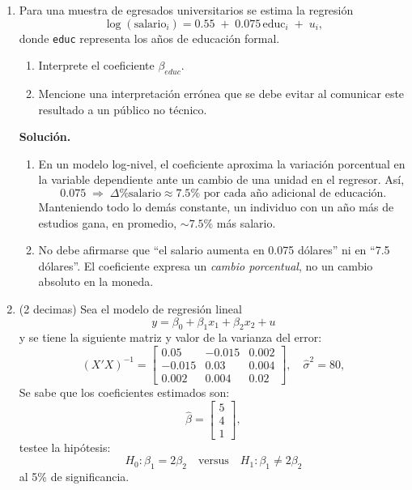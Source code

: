 \documentclass[10pt,a4paper]{article}
\begin{document}
\begin{enumerate}
 \item Para una muestra de egresados universitarios se estima la regresión
        \[
          \log(\text{salario}_i)
          = 0.55 \;+\; 0.075\,\text{educ}_i \;+\; u_i ,
        \]
        donde \texttt{educ} representa los años de educación formal.

        \begin{enumerate}[label=\alph*)]
          \item Interprete el coeficiente $\beta_{educ}$.
          \item Mencione una interpretación errónea que se debe evitar al
                comunicar este resultado a un público no técnico.
        \end{enumerate}

        \textbf{Solución.}
        \begin{enumerate}[label=\alph*)]
          \item En un modelo log‐nivel, el coeficiente aproxima la variación
                porcentual en la variable dependiente ante un cambio de una
                unidad en el regresor.  Así,
                \[
                  0.075
                  \;\Longrightarrow\;
                  \Delta\%\text{salario} \approx 7.5\%
                  \text{ por cada año adicional de educación.}
                \]
                Manteniendo todo lo demás constante, un individuo con un año
                más de estudios gana, en promedio, \(\sim7.5\%\) más salario.
          \item No debe afirmarse que “el salario aumenta en
                0.075 dólares” ni en “7.5 dólares”.  El coeficiente expresa un
                \emph{cambio porcentual}, no un cambio absoluto en la moneda.
        \end{enumerate}

\item (2 decimas) Sea el modelo de regresión lineal
$$y = \beta_0 + \beta_1x_1 + \beta_2x_2 + u$$ y se tiene la siguiente matriz y valor de la varianza del error:
        \[
          (X'X)^{-1} =
          \begin{bmatrix}
          0.05 & -0.015 & 0.002 \\
          -0.015 & 0.03 & 0.004 \\
          0.002 & 0.004 & 0.02
          \end{bmatrix},
          \quad \hat{\sigma}^2 = 80,
        \]
Se sabe que los coeficientes estimados son:
        \[
          \hat{\beta} = \begin{bmatrix} 5 \\ 4 \\ 1 \end{bmatrix},
        \]
        testee la hipótesis:
        \[
          H_0: \beta_1 = 2\beta_2
          \quad \text{versus} \quad
          H_1: \beta_1 \neq 2\beta_2
        \]
        al 5\% de significancia.


\end{enumerate}
\end{document}
